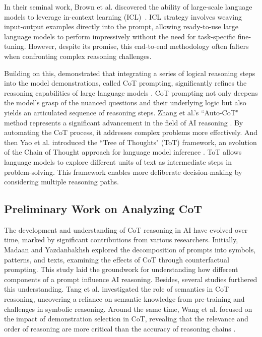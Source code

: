 \documentclass[11pt]{article}
\begin{document}
In their seminal work, Brown et al. discovered the ability of large-scale language models to leverage in-context learning (ICL)~\cite{brown2020language}. ICL strategy involves weaving input-output examples directly into the prompt, allowing ready-to-use large language models to perform impressively without the need for task-specific fine-tuning. However, despite its promise, this end-to-end methodology often falters when confronting complex reasoning challenges.

Building on this, \citeauthor{wei2022chain} demonstrated that integrating a series of logical reasoning steps into the model demonstrations, called CoT prompting, significantly refines the reasoning capabilities of large language models \cite{wei2022chain}. CoT prompting not only deepens the model's grasp of the nuanced questions and their underlying logic but also yields an articulated sequence of reasoning steps. Zhang et al.'s ``Auto-CoT" method represents a significant advancement in the field of AI reasoning \cite{zhang2022automatic}. By automating the CoT process, it addresses complex problems more effectively.
%
And then Yao et al. introduced the ``Tree of Thoughts" (ToT) framework, an evolution of the Chain of Thought approach for language model inference \cite{yao2023tree}. ToT allows language models to explore different units of text as intermediate steps in problem-solving. This framework enables more deliberate decision-making by considering multiple reasoning paths.
%
\subsection{Preliminary Work on Analyzing CoT}
The development and understanding of CoT reasoning in AI have evolved over time, marked by significant contributions from various researchers. Initially, Madaan and Yazdanbakhsh \cite{madaan2022text} explored the decomposition of prompts into symbols, patterns, and texts, examining the effects of CoT through counterfactual prompting. This study laid the groundwork for understanding how different components of a prompt influence AI reasoning.
Besides, several studies furthered this understanding. Tang et al. \cite{tang2023large} investigated the role of semantics in CoT reasoning, uncovering a reliance on semantic knowledge from pre-training and challenges in symbolic reasoning. Around the same time, Wang et al. focused on the impact of demonstration selection in CoT, revealing that the relevance and order of reasoning are more critical than the accuracy of reasoning chains \cite{wang2023selfconsistency}.
\end{document}

